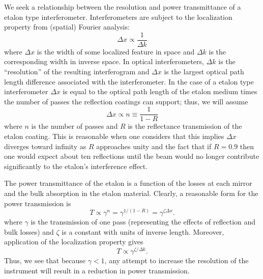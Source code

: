 We seek a relationship between the resolution and power transmittance of a etalon type interferometer. Interferometers are subject to the localization property from (spatial) Fourier analysis:
\begin{equation}
\Delta x
\propto
\frac{1}{\Delta k}
\end{equation}
where $\Delta x$ is the width of some localized feature in space and $\Delta k$ is the corresponding width in inverse space. In optical interferometers, $\Delta k$ is the ``resolution'' of the resulting interferogram and $\Delta x$ is the largest optical path length difference associated with the interferometer. In the case of a etalon type interferometer $\Delta x$ is equal to the optical path length of the etalon medium times the number of passes the reflection coatings can support; thus, we will assume
\begin{equation}
\Delta x
\propto
n
\equiv
\frac{1}{1-R}
\end{equation}
where $n$ is the number of passes and $R$ is the reflectance transmission of the etalon coating. This is reasonable when one considers that this implies $\Delta x$ diverges toward infinity as $R$ approaches unity and the fact that if $R=0.9$ then one would expect about ten reflections until the beam would no longer contribute significantly to the etalon's interference effect.

The power transmittance of the etalon is a function of the losses at each mirror and the bulk absorption in the etalon material. Clearly, a reasonable form for the power transmission is
\begin{equation}
T
\propto
\gamma^{n}
=
\gamma^{1/(1-R)}
=
\gamma^{\zeta \Delta x}.
\end{equation}
where $\gamma$ is the transmission of one pass (representing the effects of reflection and bulk losses) and $\zeta$ is a constant with units of inverse length. Moreover, application of the localization property gives
\begin{equation}
T
\propto
\gamma^{\zeta/\Delta k}.
\end{equation}
Thus, we see that because $\gamma<1$, any attempt to increase the resolution of the instrument will result in a reduction in power transmission.
